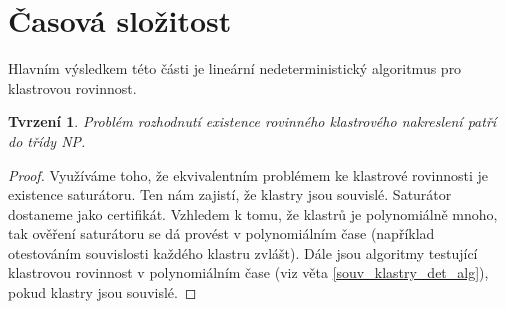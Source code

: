 \documentclass[12pt,a4report]{report}
\newtheorem{tvr}[theorem]{Tvrzení}
\theoremstyle{definition}
\begin{document}
\section{Časová složitost}
Hlavním výsledkem této části je lineární nedeterministický algoritmus pro klastrovou rovinnost.
\begin{tvr}
Problém rozhodnutí existence rovinného klastrového nakreslení patří do třídy NP.
\end{tvr}
\begin{proof}
Využíváme toho, že ekvivalentním problémem ke klastrové rovinnosti je existence saturátoru. Ten nám zajistí, že klastry jsou souvislé. Saturátor dostaneme jako certifikát. Vzhledem k tomu, že klastrů je polynomiálně mnoho, tak ověření saturátoru se dá provést  v polynomiálním čase (například otestováním souvislosti každého klastru zvlášt). Dále jsou algoritmy testující klastrovou rovinnost v polynomiálním čase (viz věta \ref{souv_klastry_det_alg}), pokud klastry jsou souvislé. 
\end{proof}
\end{document}
